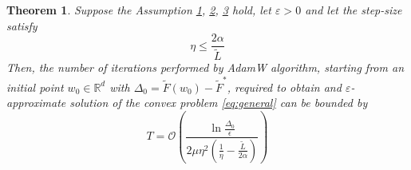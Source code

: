 \documentclass{article}
\newtheorem{theorem}{Theorem}
\begin{document}
\begin{theorem}
    Suppose the Assumption \hyperref[ass:convex]{1}, \hyperref[ass:Lsmoothness]{2}, \hyperref[ass:plcondition]{3} hold, let $\varepsilon > 0$ and let the step-size satisfy
    \begin{equation*}
        \eta \leq \frac{2 \alpha}{\tilde{L}}
    \end{equation*}
    Then, the number of iterations performed by AdamW algorithm, starting from an initial point $w_0 \in \mathbb{R}^d$ with $\Delta_0 = \tilde{F}(w_0) - \tilde{F}^*$, required to obtain and $\varepsilon$-approximate solution of the convex problem \eqref{eq:general} can be bounded by
    \begin{equation*}
        T =  \mathcal{O}\left( \frac{\ln \frac{\Delta_0}{\epsilon}}{2 \mu \eta^2(\frac{1}{\eta} - \frac{\tilde{L}}{2 \alpha})} \right)
    \end{equation*}
    \label{theor:2}
\end{theorem}
\end{document}
